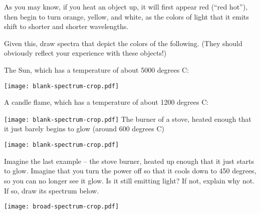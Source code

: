 \documentclass[11pt]{article}
\begin{document}
As you may know, if you heat an object up, it will first appear red (``red hot''), then begin to turn orange, yellow, and white, as the colors of light 
that it emits shift to shorter and shorter wavelengths.

Given this, draw spectra that depict the colors of the following. (They should obviously reflect your experience with these objects!)

\begin{center}

\large

The Sun, which has a temperature of about 5000 degrees C:

\texttt{[image: blank-spectrum-crop.pdf]}

\bigskip

A candle flame, which has a temperature of about 1200 degrees C:

\texttt{[image: blank-spectrum-crop.pdf]}
\bigskip
\newpage
The burner of a stove, heated enough that it just barely begins to glow (around 600 degrees C)

\texttt{[image: blank-spectrum-crop.pdf]}
\bigskip

\end{center}

Imagine the last example -- the stove burner, heated up enough that it just starts to glow. Imagine that you turn the power off so that it cools down to
450 degrees, so you can no longer see it glow. Is it still emitting light? If not, explain why not. If so, draw its spectrum below.

\begin{center}

\texttt{[image: broad-spectrum-crop.pdf]}

\end{center}
\end{document}

